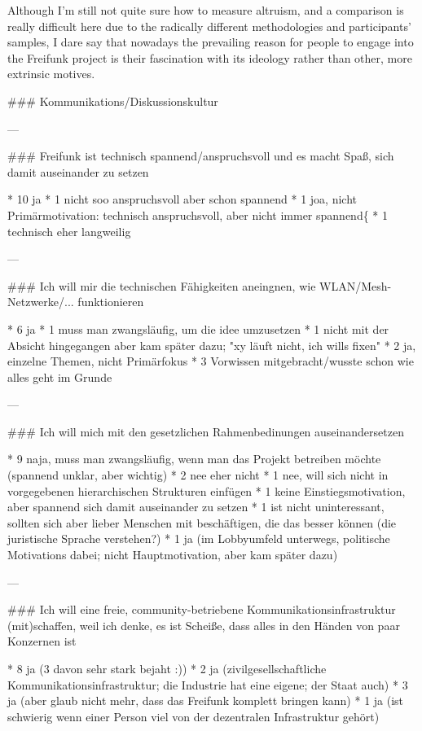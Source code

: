 
Although I'm still not quite sure how to measure altruism, and a comparison is really difficult here due to the radically different methodologies and participants' samples, I dare say that nowadays the prevailing reason for people to engage into the Freifunk project is their fascination with its ideology rather than other, more extrinsic motives.

### Kommunikations/Diskussionskultur


---

### Freifunk ist technisch spannend/anspruchsvoll und es macht Spaß, sich damit auseinander zu setzen

* 10 ja
* 1 nicht soo anspruchsvoll aber schon spannend
* 1 joa, nicht Primärmotivation: technisch anspruchsvoll, aber nicht immer spannend^^;
* 1 technisch eher langweilig

---

### Ich will mir die technischen Fähigkeiten aneingnen, wie WLAN/Mesh-Netzwerke/... funktionieren

* 6 ja
* 1 muss man zwangsläufig, um die idee umzusetzen
* 1 nicht mit der Absicht hingegangen aber kam später dazu; "xy läuft nicht, ich wills fixen"
* 2 ja, einzelne Themen, nicht Primärfokus
* 3 Vorwissen mitgebracht/wusste schon wie alles geht im Grunde

---

### Ich will mich mit den gesetzlichen Rahmenbedinungen auseinandersetzen

* 9 naja, muss man zwangsläufig, wenn man das Projekt betreiben möchte (spannend unklar, aber wichtig)
* 2 nee eher nicht
* 1 nee, will sich nicht in vorgegebenen hierarchischen Strukturen einfügen
* 1 keine Einstiegsmotivation, aber spannend sich damit auseinander zu setzen
* 1 ist nicht uninteressant, sollten sich aber lieber Menschen mit beschäftigen, die das besser können (die juristische Sprache verstehen?)
* 1 ja (im Lobbyumfeld unterwegs, politische Motivations dabei; nicht Hauptmotivation, aber kam später dazu)

---

### Ich will eine freie, community-betriebene Kommunikationsinfrastruktur (mit)schaffen, weil ich denke, es ist Scheiße, dass alles in den Händen von paar Konzernen ist

* 8 ja (3 davon sehr stark bejaht :))
* 2 ja (zivilgesellschaftliche Kommunikationsinfrastruktur; die Industrie hat eine eigene; der Staat auch)
* 3 ja (aber glaub nicht mehr, dass das Freifunk komplett bringen kann)
* 1 ja (ist schwierig wenn einer Person viel von der dezentralen Infrastruktur gehört)

